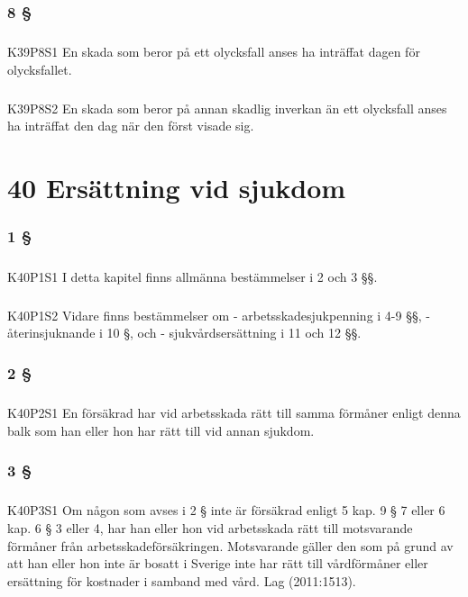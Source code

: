 \documentclass[a4paper,notitlepage,openany,10pt]{book}
\begin{document}
\subsection*{8 §}
\paragraph*{}
{\tiny K39P8S1}
En skada som beror på ett olycksfall anses ha inträffat dagen för olycksfallet.
\paragraph*{}
{\tiny K39P8S2}
En skada som beror på annan skadlig inverkan än ett olycksfall anses ha inträffat den dag när den först visade sig.
\chapter*{40 Ersättning vid sjukdom}
\subsection*{1 §}
\paragraph*{}
{\tiny K40P1S1}
I detta kapitel finns allmänna bestämmelser i 2 och 3 §§.
\paragraph*{}
{\tiny K40P1S2}
Vidare finns bestämmelser om
\newline - arbetsskadesjukpenning i 4-9 §§,
\newline - återinsjuknande i 10 §, och
\newline - sjukvårdsersättning i 11 och 12 §§.
\subsection*{2 §}
\paragraph*{}
{\tiny K40P2S1}
En försäkrad har vid arbetsskada rätt till samma förmåner enligt denna balk som han eller hon har rätt till vid annan sjukdom.
\subsection*{3 §}
\paragraph*{}
{\tiny K40P3S1}
Om någon som avses i 2 § inte är försäkrad enligt 5 kap. 9 § 7 eller 6 kap. 6 § 3 eller 4, har han eller hon vid arbetsskada rätt till motsvarande förmåner från arbetsskadeförsäkringen. Motsvarande gäller den som på grund av att han eller hon inte är bosatt i Sverige inte har rätt till vårdförmåner eller ersättning för kostnader i samband med vård.
Lag (2011:1513).
\end{document}
